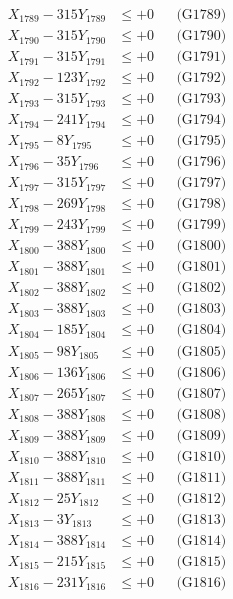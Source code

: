\documentclass[a4paper,10pt]{article}
\begin{document}
{\begin{align}
X_{1789} - 315Y_{1789} &\leq +0 && \text{(G1789)} \\
X_{1790} - 315Y_{1790} &\leq +0 && \text{(G1790)} \\
\allowbreak
X_{1791} - 315Y_{1791} &\leq +0 && \text{(G1791)} \\
X_{1792} - 123Y_{1792} &\leq +0 && \text{(G1792)} \\
X_{1793} - 315Y_{1793} &\leq +0 && \text{(G1793)} \\
X_{1794} - 241Y_{1794} &\leq +0 && \text{(G1794)} \\
X_{1795} - 8Y_{1795} &\leq +0 && \text{(G1795)} \\
X_{1796} - 35Y_{1796} &\leq +0 && \text{(G1796)} \\
X_{1797} - 315Y_{1797} &\leq +0 && \text{(G1797)} \\
X_{1798} - 269Y_{1798} &\leq +0 && \text{(G1798)} \\
X_{1799} - 243Y_{1799} &\leq +0 && \text{(G1799)} \\
X_{1800} - 388Y_{1800} &\leq +0 && \text{(G1800)} \\
\allowbreak
X_{1801} - 388Y_{1801} &\leq +0 && \text{(G1801)} \\
X_{1802} - 388Y_{1802} &\leq +0 && \text{(G1802)} \\
X_{1803} - 388Y_{1803} &\leq +0 && \text{(G1803)} \\
X_{1804} - 185Y_{1804} &\leq +0 && \text{(G1804)} \\
X_{1805} - 98Y_{1805} &\leq +0 && \text{(G1805)} \\
X_{1806} - 136Y_{1806} &\leq +0 && \text{(G1806)} \\
X_{1807} - 265Y_{1807} &\leq +0 && \text{(G1807)} \\
X_{1808} - 388Y_{1808} &\leq +0 && \text{(G1808)} \\
X_{1809} - 388Y_{1809} &\leq +0 && \text{(G1809)} \\
X_{1810} - 388Y_{1810} &\leq +0 && \text{(G1810)} \\
\allowbreak
X_{1811} - 388Y_{1811} &\leq +0 && \text{(G1811)} \\
X_{1812} - 25Y_{1812} &\leq +0 && \text{(G1812)} \\
X_{1813} - 3Y_{1813} &\leq +0 && \text{(G1813)} \\
X_{1814} - 388Y_{1814} &\leq +0 && \text{(G1814)} \\
X_{1815} - 215Y_{1815} &\leq +0 && \text{(G1815)} \\
X_{1816} - 231Y_{1816} &\leq +0 && \text{(G1816)} \\

\end{align}}
\end{document}
